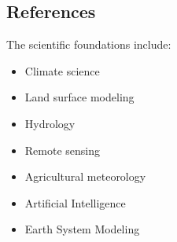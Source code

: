 
\subsection{References}

The scientific foundations include:

\begin{itemize}

\item Climate science

\item Land surface modeling

\item Hydrology

\item Remote sensing

\item Agricultural meteorology

\item Artificial Intelligence

\item Earth System Modeling

\end{itemize}




